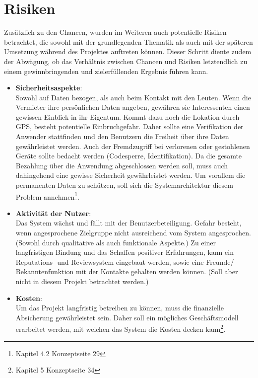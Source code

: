 
\section{Risiken}
Zusätzlich zu den Chancen, wurden im Weiteren auch potentielle Risiken betrachtet, die sowohl mit der grundlegenden Thematik als auch mit der späteren Umsetzung während des Projektes auftreten können.
Dieser Schritt diente zudem der Abwägung, ob das Verhältnis zwischen Chancen und Risiken letztendlich zu einem gewinnbringenden und zielerfüllenden Ergebnis führen kann.\\

\begin{itemize}
   \item \textbf{Sicherheitsaspekte}:\\ Sowohl auf Daten bezogen, als auch beim Kontakt mit den Leuten. Wenn die Vermieter ihre persönlichen Daten angeben, gewähren sie Interessenten einen gewissen Einblick in ihr Eigentum. Kommt dazu noch die Lokation durch GPS, besteht potentielle Einbruchgefahr. Daher sollte eine Verifikation der Anwender stattfinden und den Benutzern die Freiheit über ihre Daten gewährleistet werden. Auch der Fremdzugriff bei verlorenen oder gestohlenen Geräte sollte bedacht werden (Codesperre, Identifikation). Da die gesamte Bezahlung über die Anwendung abgeschlossen werden soll, muss auch dahingehend eine gewisse Sicherheit gewährleistet werden. Um vorallem die permanenten Daten zu schützen, soll sich die Systemarchitektur diesem Problem annehmen\footnote{Kapitel 4.2 Konzeptseite 29}.

   \item \textbf{Aktivität der Nutzer}:\\ Das System wächst und fällt mit der Benutzerbeteiligung. Gefahr besteht, wenn angesprochene Zielgruppe nicht ausreichend vom System angesprochen. (Sowohl durch qualitative als auch funktionale Aspekte.) Zu einer langfristigen Bindung und das Schaffen positiver Erfahrungen, kann ein Reputations- und Reviewsystem eingebaut werden, sowie eine Freunde/ Bekanntenfunktion mit der Kontakte gehalten werden können. (Soll aber nicht in diesem Projekt betrachtet werden.)

   \item \textbf{Kosten}:\\ Um das Projekt langfristig betreiben zu können, muss die finanzielle Absicherung gewährleistet sein. Daher soll ein mögliches Geschäftsmodell erarbeitet werden, mit welchen das System die Kosten decken kann\footnote{Kapitel 5 Konzeptseite 34}.


\end{itemize}

